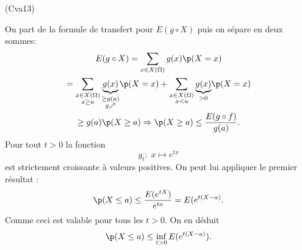 \begin{tiny}(Cva13)\end{tiny} On part de la formule de transfert pour $E(g\circ X)$ puis on sépare en deux sommes:
\begin{multline*}
  E(g \circ X)
  = 
  \sum_{x \in X(\Omega)}g(x) \p(X=x)\\
  = \sum_{\substack{x \in X(\Omega) \\ x\geq a}}\underset{\substack{\geq g(a) \\ g \nearrow}}{\underbrace{g(x)}} \p(X=x)
  + \sum_{\substack{x \in X(\Omega) \\ x < a}}\underset{> 0}{\underbrace{g(x)}} \p(X=x)\\
  \geq g(a) \p(X \geq a)
  \Rightarrow 
  \p(X\geq a) \leq \frac{E(g\circ f)}{g(a)}.
\end{multline*}
Pour tout $t>0$ la fonction
\[
  g_t:\; x \mapsto e^{tx}
\]
est strictement croissante à valeurs positives. On peut lui appliquer le premier résultat :
\[
  \p(X\leq a) \leq \frac{E(e^{tX})}{e^{ta}}
  = E(e^{t(X-a)}.
\]
Comme ceci est valable pour tous les $t>0$. On en déduit
\[
  \p(X \leq a) \leq \inf_{t >0} E(e^{t(X-a)}).
\]
